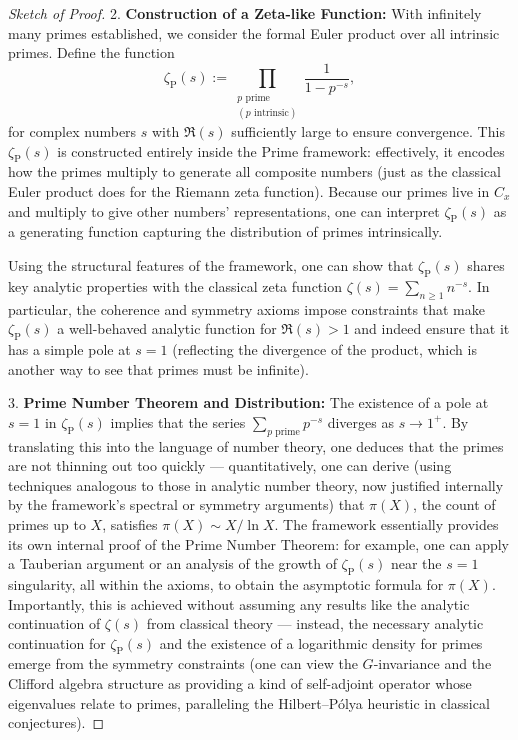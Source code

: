 \documentclass[11pt]{article}
\begin{document}
\begin{proof}[Sketch of Proof]
2. \textbf{Construction of a Zeta-like Function:} With infinitely many primes established, we consider the formal Euler product over all intrinsic primes. Define the function 
\[ \zeta_{\mathrm{P}}(s) := \prod_{\substack{p \text{ prime}\\(p \text{ intrinsic})}} \frac{1}{1 - p^{-s}}, \] 
for complex numbers $s$ with $\Re(s)$ sufficiently large to ensure convergence. This $\zeta_{\mathrm{P}}(s)$ is constructed entirely inside the Prime framework: effectively, it encodes how the primes multiply to generate all composite numbers (just as the classical Euler product does for the Riemann zeta function). Because our primes live in $C_x$ and multiply to give other numbers’ representations, one can interpret $\zeta_{\mathrm{P}}(s)$ as a generating function capturing the distribution of primes intrinsically. 

Using the structural features of the framework, one can show that $\zeta_{\mathrm{P}}(s)$ shares key analytic properties with the classical zeta function $\zeta(s) = \sum_{n\ge1} n^{-s}$. In particular, the coherence and symmetry axioms impose constraints that make $\zeta_{\mathrm{P}}(s)$ a well-behaved analytic function for $\Re(s) > 1$ and indeed ensure that it has a simple pole at $s=1$ (reflecting the divergence of the product, which is another way to see that primes must be infinite). 

3. \textbf{Prime Number Theorem and Distribution:} The existence of a pole at $s=1$ in $\zeta_{\mathrm{P}}(s)$ implies that the series $\sum_{p \text{ prime}} p^{-s}$ diverges as $s \to 1^+$. By translating this into the language of number theory, one deduces that the primes are not thinning out too quickly — quantitatively, one can derive (using techniques analogous to those in analytic number theory, now justified internally by the framework's spectral or symmetry arguments) that $\pi(X)$, the count of primes up to $X$, satisfies $\pi(X) \sim X/\ln X$. The framework essentially provides its own internal proof of the Prime Number Theorem: for example, one can apply a Tauberian argument or an analysis of the growth of $\zeta_{\mathrm{P}}(s)$ near the $s=1$ singularity, all within the axioms, to obtain the asymptotic formula for $\pi(X)$. Importantly, this is achieved without assuming any results like the analytic continuation of $\zeta(s)$ from classical theory — instead, the necessary analytic continuation for $\zeta_{\mathrm{P}}(s)$ and the existence of a logarithmic density for primes emerge from the symmetry constraints (one can view the $G$-invariance and the Clifford algebra structure as providing a kind of self-adjoint operator whose eigenvalues relate to primes, paralleling the Hilbert–Pólya heuristic in classical conjectures).


\end{proof}
\end{document}
